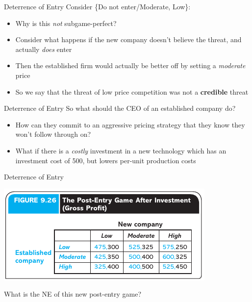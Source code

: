 
\begin{frame}{Deterrence of Entry}
  Consider \{Do not enter/Moderate, Low\}:
  \begin{itemize}
    \item Why is this \textit{not} subgame-perfect?
    \item Consider what happens if the new company doesn't believe the threat, 
    and actually \textit{does} enter
    \item Then the established firm would actually be better off by setting a \textit{moderate} price
    \item So we say that the threat of low price competition was not a \textbf{credible} threat
  \end{itemize}
\end{frame}

\begin{frame}{Deterrence of Entry}
  So what should the CEO of an established company do? 
  \begin{itemize}
    \item How can they commit to an aggressive pricing strategy that they know they won't follow through on? 
    \item What if there is a \textit{costly} investment in a new technology which has an investment cost of 500,
    but lowers per-unit production costs
  \end{itemize}
\end{frame}

\begin{frame}{Deterrence of Entry}
  \begin{center}
    \includegraphics[width=.8\textwidth]{figures/fig926.png}
  \end{center} 
  What is the NE of this new post-entry game?
\end{frame}

